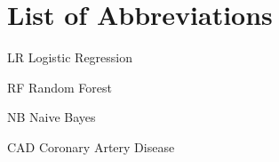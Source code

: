 \chapter*{List of Abbreviations}
\begin{abbrv}
    \item[LR]			Logistic Regression
    \item[RF]			Random Forest
    \item[NB]			Naive Bayes
    \item[CAD]           Coronary Artery 
Disease
\end{abbrv}
